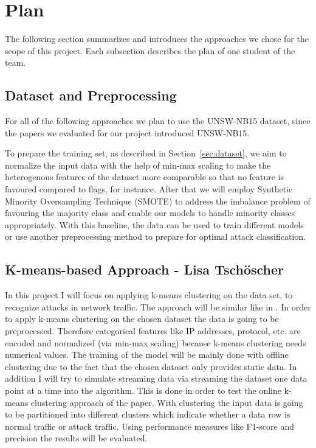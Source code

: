 \section{Plan}
The following section summarizes and introduces the approaches we chose for the scope of this project. Each subsection describes the plan of one student of the team.

\subsection{Dataset and Preprocessing}
For all of the following approaches we plan to use the UNSW-NB15 \cite{UNSW} dataset, since the papers we evaluated for our project introduced UNSW-NB15.

\nextparagraph
To prepare the training set, as described in Section~\ref{sec:dataset}, we aim to normalize the input data with the help of min-max scaling to make the heterogenous features of the dataset more comparable so that no feature is favoured compared to flags, for instance. After that we will employ Synthetic Minority Oversampling Technique (SMOTE) to address the imbalance problem of favouring the majority class and enable our models to handle minority classes appropriately. With this baseline, the data can be used to train different models or use another preprocessing method to prepare for optimal attack classification.

\subsection{K-means-based Approach - Lisa Tschöscher}
In this project I will focus on applying k-means clustering on the data set, to recognize attacks in network traffic. The approach will be similar like in \cite{younisse2023empirical}.
In order to apply  k-means clustering on the chosen dataset the data is going to be preprocessed. Therefore categorical features like IP addresses, protocol, etc. are encoded and normalized (via min-max scaling) because k-means clustering needs numerical values. The training of the model will be mainly done with offline clustering due to the fact that the chosen dataset only provides static data. In addition I will try to simulate streaming data via streaming the dataset one data point at a time into the algorithm. This is done in order to test the online k-means clustering approach of the paper.
With clustering the input data is going to be partitioned into different clusters which indicate whether a data row is normal traffic or attack traffic. Using performance measures like F1-score and precision the results will be evaluated.

